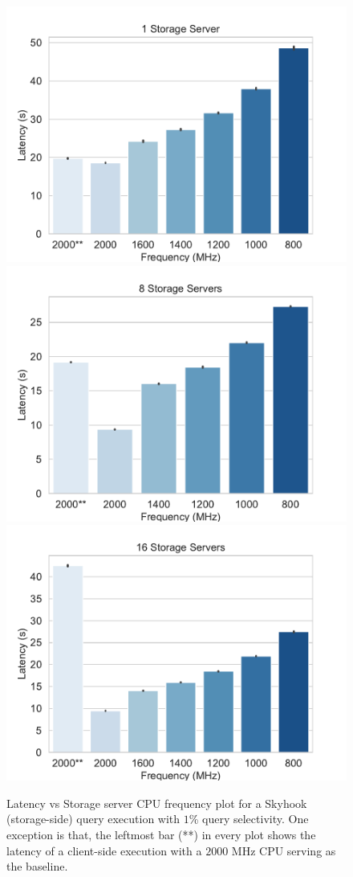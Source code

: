 \documentclass[11pt]{article}
\begin{document}
\begin{figure}[htp]

\centering
\includegraphics[width=.63\textwidth]{figs/plot_1.pdf}\hfill
\includegraphics[width=.63\textwidth]{figs/plot_8.pdf}\hfill
\includegraphics[width=.63\textwidth]{figs/plot_16.pdf}

\caption{Latency vs Storage server CPU frequency plot for a Skyhook (storage-side) query execution with $1$\% query selectivity. One exception is that, the leftmost bar (**) in every plot shows the latency of a client-side execution with a $2000$ MHz CPU serving as the baseline.}
\label{fig:cpu}

\end{figure}
\end{document}
